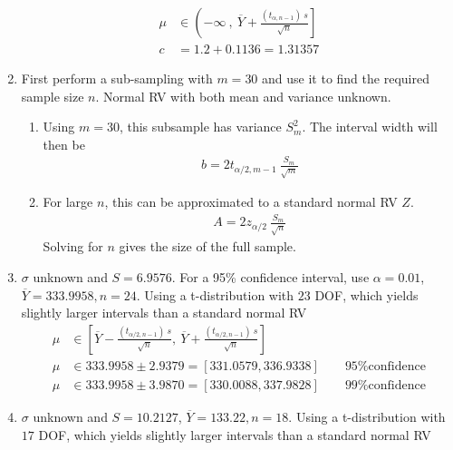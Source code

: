 \begin{enumerate}
		\begin{align}
			\mu &\in \left(-\infty\ , \ \overline{Y} + \frac{(t_{\alpha, n-1})\ s}{\sqrt{n}} \right] \nonumber \\
			c &= 1.2 + 0.1136 = 1.31357
		\end{align}
	
	
	\item First perform a sub-sampling with $ m = 30$ and use it to find the required sample size $ n $. Normal RV with both mean and variance unknown.
	
		\begin{enumerate}
			\item Using $ m = 30 $, this subsample has variance $ S^2_m $. The interval width will then be\\
			\begin{align}
				b = 2t_{\alpha/2, m-1}\ \frac{S_m}{\sqrt{m}}
			\end{align}
			
			\item For large $ n $, this can be approximated to a standard normal RV $ Z $.
			\begin{align}
				A = 2z_{\alpha/2}\ \frac{S_m}{\sqrt{n}}
			\end{align}
			Solving for $ n $ gives the size of the full sample.
		\end{enumerate}
	
	
	\item $ \sigma $ unknown and $ S = 6.9576 $. For a 95\% confidence interval, use $ \alpha = 0.01 $, $ \overline{Y} = 333.9958, n = 24$. Using a t-distribution with $ 23 $ DOF, which yields slightly larger intervals than a standard normal RV\\
	
		\begin{align}
			\mu &\in \left[ \overline{Y} - \frac{(t_{\alpha/2, n-1})\ s}{\sqrt{n}}, \ \overline{Y} + \frac{(t_{\alpha/2, n-1})\ s}{\sqrt{n}} \right] \nonumber \\
			\mu &\in 333.9958 \pm 2.9379 = [331.0579, 336.9338] \qquad \text{95\% confidence} \nonumber \\
			\mu &\in 333.9958 \pm 3.9870 = [330.0088, 337.9828] \qquad \text{99\% confidence} 
		\end{align}
	
	
	\item $ \sigma $ unknown and $ S = 10.2127 $, $ \overline{Y} = 133.22, n = 18$. Using a t-distribution with $ 17 $ DOF, which yields slightly larger intervals than a standard normal RV\\
	

\end{enumerate}
